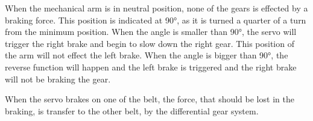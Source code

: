 When the mechanical arm is in neutral position, none of the gears is effected by a braking force. This position is indicated at 90°, as it is turned a quarter of a turn from the minimum position. When the angle is smaller than 90°, the servo will trigger the right brake and begin to slow down the right gear. This position of the arm will not effect the left brake. When the angle is bigger than 90°, the reverse function will happen and the left brake is triggered and the right brake will not be braking the gear.

When the servo brakes on one of the belt, the force, that should be lost in the braking, is transfer to the other belt, by the differential gear system.